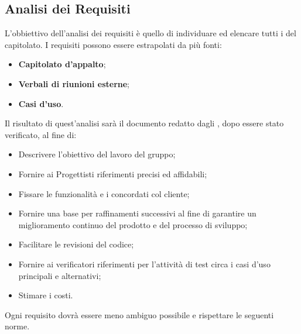\documentclass[NormeDiProgetto.tex]{subfiles}
\begin{document}
\subsection{Analisi dei Requisiti}
L'obbiettivo dell'analisi dei requisiti è quello di individuare ed elencare tutti i  del capitolato. I requisiti possono essere estrapolati da più fonti:
\begin{itemize}
	\item \textbf{Capitolato d’appalto};
	\item \textbf{Verbali di riunioni esterne};
	\item \textbf{Casi d’uso}.
\end{itemize}
Il risultato di quest'analisi sarà il documento \adr \vruno redatto dagli \alisti, dopo essere stato verificato, al fine di:
\begin{itemize}
\item Descrivere l'obiettivo del lavoro del gruppo;
\item Fornire ai Progettisti riferimenti precisi ed affidabili;
\item Fissare le funzionalità e i  concordati col cliente;
\item Fornire una base per raffinamenti successivi al fine di garantire un
miglioramento continuo del prodotto e del processo di sviluppo;
\item Facilitare le revisioni del codice;
\item Fornire ai verificatori riferimenti per l’attività di test circa i casi d’uso principali e alternativi;
\item Stimare i costi.
\end{itemize}
Ogni requisito dovrà essere meno ambiguo possibile e rispettare le seguenti norme.
\end{document}
